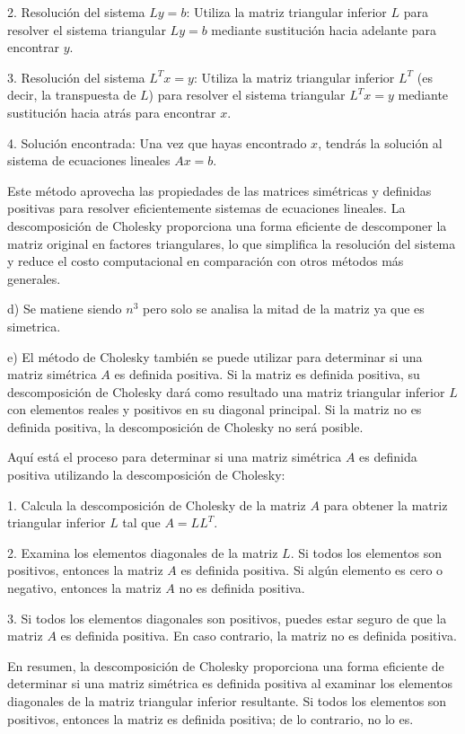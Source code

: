 \documentclass[a4paper,12pt]{article}
\begin{document}
2. Resolución del sistema \(Ly = b\): Utiliza la matriz triangular inferior \( L \) para resolver el sistema triangular \( Ly = b \) mediante sustitución hacia adelante para encontrar \( y \).

3. Resolución del sistema \(L^Tx = y\): Utiliza la matriz triangular inferior \( L^T \) (es decir, la transpuesta de \( L \)) para resolver el sistema triangular \( L^Tx = y \) mediante sustitución hacia atrás para encontrar \( x \).

4. Solución encontrada: Una vez que hayas encontrado \( x \), tendrás la solución al sistema de ecuaciones lineales \( Ax = b \).

Este método aprovecha las propiedades de las matrices simétricas y definidas positivas para resolver eficientemente sistemas de ecuaciones lineales. La descomposición de Cholesky proporciona una forma eficiente de descomponer la matriz original en factores triangulares, lo que simplifica la resolución del sistema y reduce el costo computacional en comparación con otros métodos más generales.

d)
Se matiene siendo $n^3$ pero solo se analisa la mitad de la matriz ya que es simetrica.

e)
El método de Cholesky también se puede utilizar para determinar si una matriz simétrica \( A \) es definida positiva. Si la matriz es definida positiva, su descomposición de Cholesky dará como resultado una matriz triangular inferior \( L \) con elementos reales y positivos en su diagonal principal. Si la matriz no es definida positiva, la descomposición de Cholesky no será posible.

Aquí está el proceso para determinar si una matriz simétrica \( A \) es definida positiva utilizando la descomposición de Cholesky:

1. Calcula la descomposición de Cholesky de la matriz \( A \) para obtener la matriz triangular inferior \( L \) tal que \( A = LL^T \).

2. Examina los elementos diagonales de la matriz \( L \). Si todos los elementos son positivos, entonces la matriz \( A \) es definida positiva. Si algún elemento es cero o negativo, entonces la matriz \( A \) no es definida positiva.

3. Si todos los elementos diagonales son positivos, puedes estar seguro de que la matriz \( A \) es definida positiva. En caso contrario, la matriz no es definida positiva.

En resumen, la descomposición de Cholesky proporciona una forma eficiente de determinar si una matriz simétrica es definida positiva al examinar los elementos diagonales de la matriz triangular inferior resultante. Si todos los elementos son positivos, entonces la matriz es definida positiva; de lo contrario, no lo es.
\end{document}
